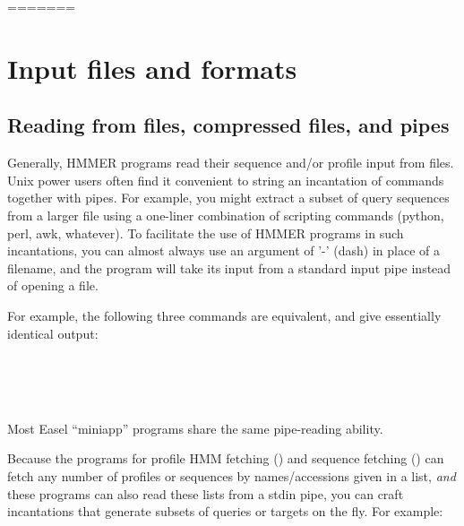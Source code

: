   
=======
\chapter{Input files and formats}
\label{chapter:formats}
\setcounter{footnote}{0}

\section{Reading from files, compressed files, and pipes}

Generally, HMMER programs read their sequence and/or profile input
from files. Unix power users often find it convenient to string an
incantation of commands together with pipes. For example, you might
extract a subset of query sequences from a larger file using a
one-liner combination of scripting commands (python, perl, awk,
whatever). To facilitate the use of HMMER programs in such
incantations, you can almost always use an argument of '-' (dash) in
place of a filename, and the program will take its input from a
standard input pipe instead of opening a file.

For example, the following three commands are equivalent, and give
essentially identical output:

   \vspace{1ex}
     \\
    \\
    \\
   \vspace{1ex}

Most Easel ``miniapp'' programs share the same pipe-reading ability.

Because the programs for profile HMM fetching () and
sequence fetching () can fetch any number of profiles
or sequences by names/accessions given in a list, \emph{and} these
programs can also read these lists from a stdin pipe, you can craft
incantations that generate subsets of queries or targets on the
fly. For example:

   \vspace{1ex}
   \begin{fullwidth}
    \\
    \\
   \end{fullwidth}
   \vspace{1ex}

